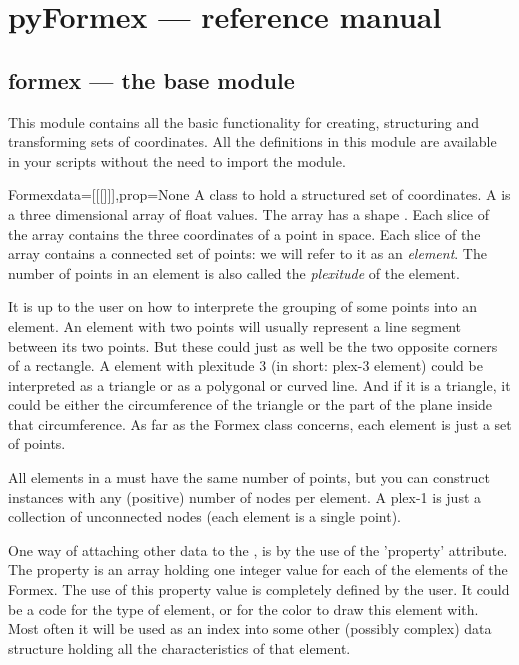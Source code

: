 
\chapter{pyFormex --- reference manual}
{\label{cha:reference}

\section{formex --- the base module}
{\label{sec:formex}

This module contains all the basic functionality for creating, structuring and transforming sets of coordinates. All the definitions in this module are available in your scripts without the need to import the module.

\begin{classdesc}{Formex}{data=[[[]]],prop=None}
A class to hold a structured set of coordinates. A  is a three dimensional array of float values. The array has a shape . Each slice \Code{[i,j]} of the array contains the three coordinates of a point in space. Each slice \Code{[i]} of the array contains a connected set of  points: we will refer to it as an \emph{element}. The number of points in an element is also called the \emph{plexitude} of the element.

It is up to the user on how to interprete the grouping of some points into an element. An element with two points  will usually represent a line segment between its two points. But these could just as well be the two opposite corners of a rectangle.
A element with plexitude 3 (in short: plex-3 element) could be interpreted as a triangle or as a polygonal or curved line. And if it is a triangle, it could be either the circumference of the triangle or the part of the plane inside that circumference. As far as the Formex class concerns, each element is just a set of points. 

All elements in a  must have the same number of points, but you can construct  instances with any (positive) number of nodes per element. A plex-1  is just a collection of unconnected nodes (each element is a single point).

One way of attaching other data to the , is by the use of the 'property' attribute. The property is an array holding one integer value for each of the elements of the Formex. The use of this property value is completely defined by the user. It could be a code for the type of element, or for the color to draw this element with. Most often it will be used as an index into some other (possibly complex) data structure holding all the characteristics of that element. 


\end{classdesc}}}
